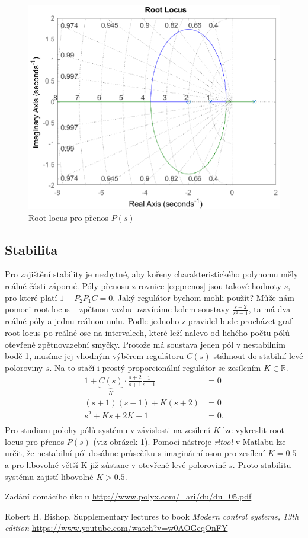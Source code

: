 \documentclass[twoside]{article}
\begin{document}
\begin{figure}[H]
	\centering
	\includegraphics{rl.eps}
	\caption{Root locus pro přenos $P(s)$}
	\label{fig:rl}
\end{figure}

\subsection{Stabilita}
Pro zajištění stability je nezbytné, aby kořeny charakteristického polynomu měly reálné části záporné.
Póly přenosu z rovnice \eqref{eq:prenos} jsou takové hodnoty $s$, pro které platí $1 + P_2 P_1 C = 0$.
Jaký regulátor bychom mohli použít? Může nám pomoci root locus -- zpětnou vazbu uzavíráme kolem
soustavy $\frac{s+2}{s^2 - 1}$, ta má dva reálné póly a jednu reálnou nulu. Podle jednoho z pravidel
bude procházet graf root locus po reálné ose na intervalech, které leží nalevo od lichého počtu pólů otevřené
zpětnovazební smyčky. Protože má soustava jeden pól v nestabilním bodě 1, musíme jej vhodným výběrem regulátoru $C(s)$ stáhnout
do stabilní levé poloroviny $s$. Na to stačí i prostý proporcionální regulátor se zesílením $K \in \mathbb{R}$.
\begin{equation}
	\begin{split}
		1 + \underbrace{C(s)}_{K} \cdot \frac{s+2}{s+1} \frac{1}{s-1} &= 0 \\
		(s+1)(s-1) + K(s+2) &= 0 \\
		s^2 +K s +2K-1 &= 0. \\
	\end{split}
\end{equation}
Pro studium polohy pólů systému v závislosti na zesílení $K$ lze vykreslit root locus pro přenos $P(s)$ (viz obrázek \ref{fig:rl}).
Pomocí nástroje \textit{rltool} v Matlabu lze určit, že nestabilní pól dosáhne průsečíku s imaginární osou
pro zesílení $K = 0.5$ a pro libovolné větší K již zůstane v otevřené levé polorovině $s$. Proto stabilitu systému zajistí libovolné $K > 0.5$.


\begin{thebibliography}{9}

	 Zadání domácího úkolu \url{http://www.polyx.com/_ari/du/du_05.pdf}

	Robert H. Bishop, Supplementary lectures to book \emph{Modern control systems, 13th edition} \url{https://www.youtube.com/watch?v=w0AOGeqOnFY}

\end{thebibliography}
\end{document}
